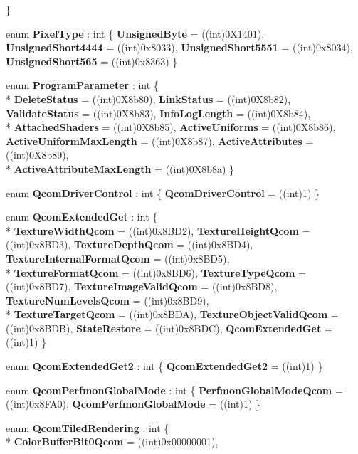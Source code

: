 \begin{DoxyCompactItemize}
 \}
\item 
enum {\bfseries Pixel\-Type} \-: int \{ {\bfseries Unsigned\-Byte} = ((int)0\-X1401), 
{\bfseries Unsigned\-Short4444} = ((int)0x8033), 
{\bfseries Unsigned\-Short5551} = ((int)0x8034), 
{\bfseries Unsigned\-Short565} = ((int)0x8363)
 \}
\item 
enum {\bfseries Program\-Parameter} \-: int \{ \\*
{\bfseries Delete\-Status} = ((int)0\-X8b80), 
{\bfseries Link\-Status} = ((int)0\-X8b82), 
{\bfseries Validate\-Status} = ((int)0\-X8b83), 
{\bfseries Info\-Log\-Length} = ((int)0\-X8b84), 
\\*
{\bfseries Attached\-Shaders} = ((int)0\-X8b85), 
{\bfseries Active\-Uniforms} = ((int)0\-X8b86), 
{\bfseries Active\-Uniform\-Max\-Length} = ((int)0\-X8b87), 
{\bfseries Active\-Attributes} = ((int)0\-X8b89), 
\\*
{\bfseries Active\-Attribute\-Max\-Length} = ((int)0\-X8b8a)
 \}
\item 
enum {\bfseries Qcom\-Driver\-Control} \-: int \{ {\bfseries Qcom\-Driver\-Control} = ((int)1)
 \}
\item 
enum {\bfseries Qcom\-Extended\-Get} \-: int \{ \\*
{\bfseries Texture\-Width\-Qcom} = ((int)0x8\-B\-D2), 
{\bfseries Texture\-Height\-Qcom} = ((int)0x8\-B\-D3), 
{\bfseries Texture\-Depth\-Qcom} = ((int)0x8\-B\-D4), 
{\bfseries Texture\-Internal\-Format\-Qcom} = ((int)0x8\-B\-D5), 
\\*
{\bfseries Texture\-Format\-Qcom} = ((int)0x8\-B\-D6), 
{\bfseries Texture\-Type\-Qcom} = ((int)0x8\-B\-D7), 
{\bfseries Texture\-Image\-Valid\-Qcom} = ((int)0x8\-B\-D8), 
{\bfseries Texture\-Num\-Levels\-Qcom} = ((int)0x8\-B\-D9), 
\\*
{\bfseries Texture\-Target\-Qcom} = ((int)0x8\-B\-D\-A), 
{\bfseries Texture\-Object\-Valid\-Qcom} = ((int)0x8\-B\-D\-B), 
{\bfseries State\-Restore} = ((int)0x8\-B\-D\-C), 
{\bfseries Qcom\-Extended\-Get} = ((int)1)
 \}
\item 
enum {\bfseries Qcom\-Extended\-Get2} \-: int \{ {\bfseries Qcom\-Extended\-Get2} = ((int)1)
 \}
\item 
enum {\bfseries Qcom\-Perfmon\-Global\-Mode} \-: int \{ {\bfseries Perfmon\-Global\-Mode\-Qcom} = ((int)0x8\-F\-A0), 
{\bfseries Qcom\-Perfmon\-Global\-Mode} = ((int)1)
 \}
\item 
enum {\bfseries Qcom\-Tiled\-Rendering} \-: int \{ \\*
{\bfseries Color\-Buffer\-Bit0\-Qcom} = ((int)0x00000001), 

\end{DoxyCompactItemize}
